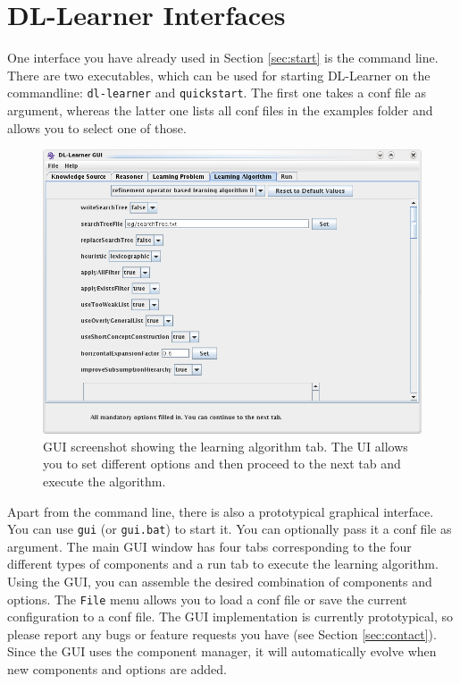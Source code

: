 \documentclass[a4paper,12pt]{scrartcl}
\begin{document}
\begin{description}
 \item 
\end{description}


\section{DL-Learner Interfaces}

One interface you have already used in Section \ref{sec:start} is the command line. There are two executables, which can be used for starting DL-Learner on the commandline: \verb|dl-learner| and \verb|quickstart|. The first one takes a conf file as argument, whereas the latter one lists all conf files in the examples folder and allows you to select one of those.

\begin{figure}
 \centering
 \includegraphics[width=.85\textwidth]{../../resources/screenshots/gui_algorithm}
 \caption{GUI screenshot showing the learning algorithm tab. The UI allows you to set different options and then proceed to the next tab and execute the algorithm.}
 \label{fig:gui}
\end{figure}

Apart from the command line, there is also a prototypical graphical interface. You can use \verb|gui| (or \verb|gui.bat|) to start it. You can optionally pass it a conf file as argument. The main GUI window has four tabs corresponding to the four different types of components and a run tab to execute the learning algorithm. Using the GUI, you can assemble the desired combination of components and options. The \verb|File| menu allows you to load a conf file or save the current configuration to a conf file. The GUI implementation is currently prototypical, so please report any bugs or feature requests you have (see Section \ref{sec:contact}). Since the GUI uses the component manager, it will automatically evolve when new components and options are added.
\end{document}
